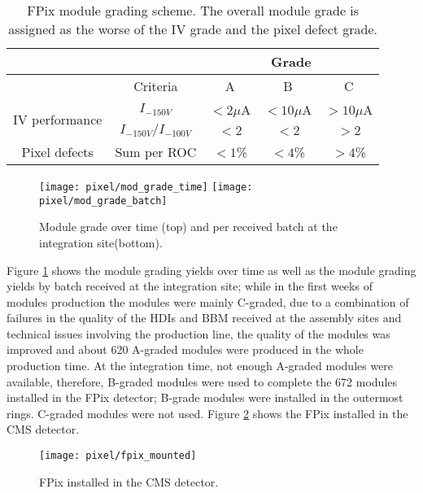 \begin{table}
  \centering
  \begin{tabular}{ c  c  c  c  c } \hline
                                    &                       & \multicolumn{3}{c}{Grade} \\\hline
                                    & Criteria              & A        &  B         &   C       \\\hline
    \multirow{2}{*}{IV performance} & $I_{-150V}$           & $<2\mu$A &  $<10\mu$A & $>10\mu$A \\
                                    & $I_{-150V}/I_{-100V}$ & $<2$     &  $<2$      & $>2$      \\\hline
    Pixel defects                   & Sum per ROC           & $<1$\%   &  $<4$\%    & $>4$\%    \\\hline
  \end{tabular}
  \caption[FPix module grading scheme.]{FPix module grading scheme. The overall module grade is assigned as the worse of the IV grade and the pixel defect grade.}\label{tab:grad_scheme}
\end{table}

\begin{figure}[h]
\begin{center}
  \texttt{[image: pixel/mod\_grade\_time]}
  \texttt{[image: pixel/mod\_grade\_batch]}
  \caption[Module grade over time.]{Module grade over time (top) and per received batch at the integration site(bottom).}\label{fig:mod_grad_time}
\end{center}
\end{figure}
Figure \ref{fig:mod_grad_time} shows the module grading yields over time as well as the module grading yields by batch received at the integration site; while in the first weeks of modules production the modules were mainly C-graded, due to a combination of failures in the quality of the HDIs and BBM received at the assembly sites and technical issues involving the production line, the quality of the modules was improved and about 620 A-graded modules were produced in the whole production time. At the integration time, not enough A-graded modules were available, therefore, B-graded modules were used to complete the 672 modules installed in the FPix detector; B-grade modules were installed in the outermost rings. C-graded modules were not used. Figure \ref{fig:fpix_mounted} shows the FPix installed in the CMS detector.

\begin{figure}[h]
\begin{center}
  \texttt{[image: pixel/fpix\_mounted]}
  \caption{FPix installed in the CMS detector.}\label{fig:fpix_mounted}
\end{center}
\end{figure}

